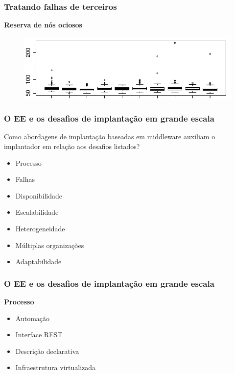 \documentclass{beamer}
\newcommand\subtitulo[1]{{\large \textbf{#1}}}
\begin{document}

\begin{frame}
\frametitle{Tratando falhas de terceiros}

\subtitulo{Reserva de nós ociosos}

\begin{figure}
\includegraphics[width=1\linewidth]{img/ec2_boxplot}
\end{figure}

\end{frame}



\begin{frame}
\frametitle{O EE e os desafios de implantação em grande escala}

Como abordagens de implantação baseadas em middleware auxiliam o implantador em relação aos desafios listados?

\begin{itemize}
\item Processo
\item Falhas
\item Disponibilidade
\item Escalabilidade
\item Heterogeneidade
\item Múltiplas organizações
\item Adaptabilidade
\end{itemize}

\end{frame}



\begin{frame}
\frametitle{O EE e os desafios de implantação em grande escala}

\subtitulo{Processo}

\begin{itemize}
\item Automação
\item Interface REST
\item Descrição declarativa
\item Infraestrutura virtualizada
\end{itemize}

\end{frame}
\end{document}
